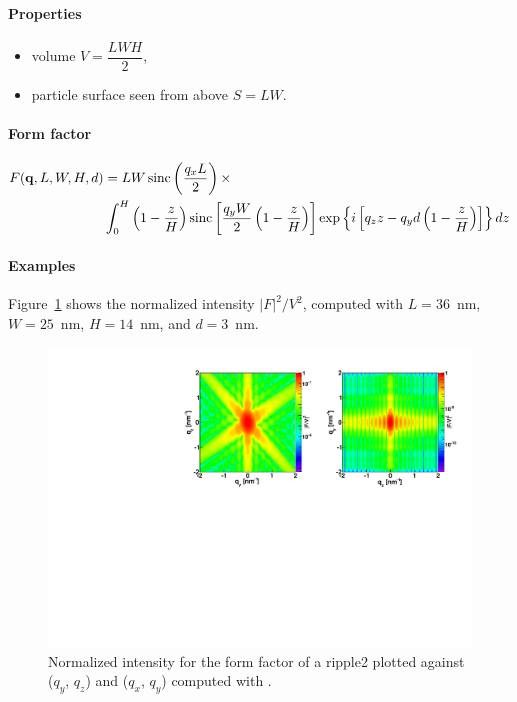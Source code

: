 \paragraph{Properties}
\begin{itemize}
\item volume $V = \dfrac{L W H}{2}$,
\item particle surface seen from above $S = L W$.
\end{itemize}

\paragraph{Form factor}
\begin{align*}
F(\mathbf{q},L,W,H,d) &=L W
\operatorname{sinc}\left(\frac{q_xL}{2}\right)\times \\ &
\int_0^H 
\left(1-\frac{z}{H}\right)
 \operatorname{sinc}\left[\frac{q_y
    W}{2}\left(1-\frac{z}{H}\right)\right] 
\exp\left\{ i\left[q_zz -
    q_yd\left(1-\frac{z}{H}\right)\right]\right\} 
dz
\end{align*}


\paragraph{Examples}
Figure~\ref{fig:FFripple2Ex} shows the normalized intensity
$|F|^2/V^2$, computed with $L=36$~nm, $W=25$~nm, $H=14$~nm, and $d=3$~nm.

\begin{figure}[h]
\begin{center}
\includegraphics[angle=-90,width=\textwidth]{fig/ff/figffripple2.pdf}
\end{center}
\caption{Normalized intensity for the form factor of a ripple2 plotted against ($q_y$, $q_z$) and  ($q_x$, $q_y$)
  computed with .}
\label{fig:FFripple2Ex}
\end{figure}


